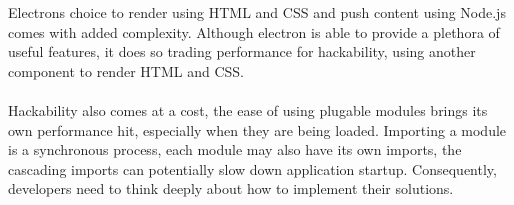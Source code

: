   Electrons choice to render using HTML and CSS and push content using Node.js comes with added complexity. Although electron is able to provide a plethora of useful features, it does so trading performance for hackability, using another component to render HTML and CSS.\\\\
  Hackability also comes at a cost, the ease of using plugable modules brings its own performance hit, especially when they are being loaded. Importing a module is a synchronous process, each module may also have its own imports, the cascading imports can potentially slow down application startup. Consequently, developers need to think deeply about how to implement their solutions.


